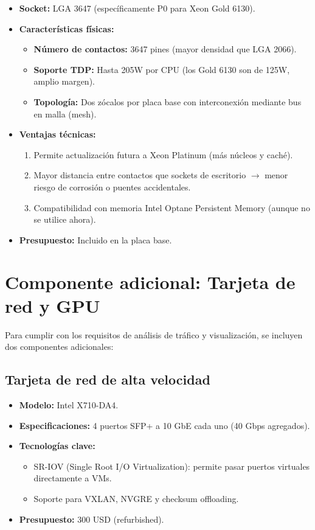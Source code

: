 \documentclass[12pt, letterpaper]{article}
\begin{document}
\begin{itemize}
    \item \textbf{Socket:} LGA 3647 (específicamente P0 para Xeon Gold 6130).
    \item \textbf{Características físicas:}
        \begin{itemize}
            \item \textbf{Número de contactos:} 3647 pines (mayor densidad que LGA 2066).
            \item \textbf{Soporte TDP:} Hasta 205W por CPU (los Gold 6130 son de 125W, amplio margen).
            \item \textbf{Topología:} Dos zócalos por placa base con interconexión mediante bus en malla (mesh).
        \end{itemize}
    \item \textbf{Ventajas técnicas:}
        \begin{enumerate}
            \item Permite actualización futura a Xeon Platinum (más núcleos y caché).
            \item Mayor distancia entre contactos que sockets de escritorio $\rightarrow$ menor riesgo de corrosión o puentes accidentales.
            \item Compatibilidad con memoria Intel Optane Persistent Memory (aunque no se utilice ahora).
        \end{enumerate}
    \item \textbf{Presupuesto:} Incluido en la placa base.
\end{itemize}

\section{Componente adicional: Tarjeta de red y GPU}

Para cumplir con los requisitos de análisis de tráfico y visualización, se incluyen dos componentes adicionales:

\subsection{Tarjeta de red de alta velocidad}

\begin{itemize}
    \item \textbf{Modelo:} Intel X710-DA4.
    \item \textbf{Especificaciones:} 4 puertos SFP+ a 10 GbE cada uno (40 Gbps agregados).
    \item \textbf{Tecnologías clave:}
        \begin{itemize}
            \item SR-IOV (Single Root I/O Virtualization): permite pasar puertos virtuales directamente a VMs.
            \item Soporte para VXLAN, NVGRE y checksum offloading.
        \end{itemize}
    \item \textbf{Presupuesto:} 300 USD (refurbished).
\end{itemize}
\end{document}
